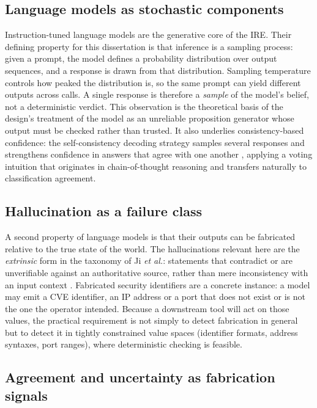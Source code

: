 \subsection*{Language models as stochastic components}

Instruction-tuned language models are the generative core of the IRE. Their
defining property for this dissertation is that inference is a sampling
process: given a prompt, the model defines a probability distribution over
output sequences, and a response is drawn from that distribution. Sampling
temperature controls how peaked the distribution is, so the same prompt can
yield different outputs across calls. A single response is therefore a
\emph{sample} of the model's belief, not a deterministic verdict. This
observation is the theoretical basis of the design's treatment of the model as
an unreliable proposition generator whose output must be checked rather than
trusted. It also underlies consistency-based confidence: the
self-consistency decoding strategy samples several responses and strengthens
confidence in answers that agree with one another \parencite{wang2023selfconsistency},
applying a voting intuition that originates in chain-of-thought reasoning and
transfers naturally to classification agreement.

\subsection*{Hallucination as a failure class}

A second property of language models is that their outputs can be fabricated
relative to the true state of the world. The hallucinations relevant here are
the \emph{extrinsic} form in the taxonomy of Ji \emph{et al.}: statements that
contradict or are unverifiable against an authoritative source, rather than
mere inconsistency with an input context \parencite{ji2023hallucination}.
Fabricated security identifiers are a concrete instance: a model may emit a
CVE identifier, an IP address or a port that does not exist or is not the one
the operator intended. Because a downstream tool will act on those values, the
practical requirement is not simply to detect fabrication in general but to
detect it in tightly constrained value spaces (identifier formats, address
syntaxes, port ranges), where deterministic checking is feasible.

\subsection*{Agreement and uncertainty as fabrication signals}

